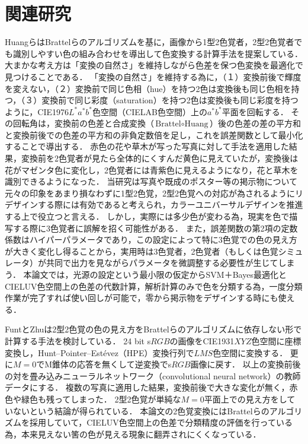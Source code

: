 \documentclass[uplatex,paper=a4,fontsize=4.0truemm,jafontsize=4.0truemm,head_space=30.0truemm,foot_space=30.0truemm,baselineskip=8.0truemm,line_length=40zw,gutter=25.0truemm,oneside,openany,fleqn,hanging_panctuation,open_bracket_pos=nibu_tentsuki,dvipdfmx,jis2004,book,titlepage]{jlreq}
\theoremstyle{mystyle}
\newcommand{\mathdisplaystyle}[1]{\(\displaystyle{#1}\)}
\begin{document}
	\chapter{関連研究}
		HuangらはBrattelらのアルゴリズムを基に，画像から1型2色覚者，2型2色覚者でも識別しやすい色の組み合わせを導出して色変換する計算手法を提案している\cite{Huang2007}．
		大まかな考え方は「変換の自然さ」を維持しながら色差を保つ色変換を最適化で見つけることである．
		「変換の自然さ」を維持する為に，（１）変換前後で輝度を変えない，（２）変換前で同じ色相（hue）を持つ2色は変換後も同じ色相を持つ，（３）変換前で同じ彩度（saturation）を持つ2色は変換後も同じ彩度を持つように，CIE1976\mathdisplaystyle{L^\ast a^\ast b^\ast}色空間（CIELAB色空間）上の\mathdisplaystyle{a^\ast b^\ast}平面を回転する．
		その回転角は，変換前の色差と合成変換（\mathdisplaystyle{\textrm{Brattel}\circ\textrm{Huang}}）後の色差の差の平方和と変換前後での色差の平方和の非負定数倍を足し，これを誤差関数として最小化することで導出する．
		赤色の花や草木が写った写真に対して手法を適用した結果，変換前を2色覚者が見たら全体的にくすんだ黄色に見えていたが，変換後は花がマゼンタ色に変化し，2色覚者には青紫色に見えるようになり，花と草木を識別できるようになった．
		当研究は写真や既成のポスター等の掲示物について元々の印象をあまり損なわずに1型2色覚，2型2色覚への対応が為されるようにリデザインする際には有効であると考えられ，カラーユニバーサルデザインを推進する上で役立つと言える．
		しかし，実際には多少色が変わる為，現実を色で描写する際に3色覚者に誤解を招く可能性がある．
		また，誤差関数の第2項の定数係数はハイパーパラメータであり，この設定によって特に3色覚での色の見え方が大きく変化し得ることから，実用時は3色覚者，2色覚者（もしくは色覚シミュレータ）が共同で出力を見ながらパラメータを微調整する必要性が生じてしまう．
		本論文では，光源の設定という最小限の仮定からSVM＋Bayes最適化とCIELUV色空間上の色差の代数計算，解析計算のみで色を分類する為，一度分類作業が完了すれば使い回しが可能で，零から掲示物をデザインする時にも使える．

		FuntとZhuは2型2色覚の色の見え方をBrattelらのアルゴリズムに依存しない形で計算する手法を検討している\cite{Funt2018}．
		24 bit s\mathdisplaystyle{RGB}の画像をCIE1931\mathdisplaystyle{XYZ}色空間に座標変換し，Hunt--Pointer--Estévez（HPE）変換行列で\mathdisplaystyle{LMS}色空間に変換する．
		更に\mathdisplaystyle{M=0}でM錐体の応答を無くして逆変換でs\mathdisplaystyle{RGB}画像に戻す．
		以上の変換前後の対を畳み込みニューラルネットワーク（convolutional neural network）の教師データにする．
		複数の写真に適用した結果，変換前後で大きな変化が無く，赤色や緑色も残ってしまった．
		2型2色覚が単純な\mathdisplaystyle{M=0}平面上での見え方をしていないという結論が得られている．
		本論文の2色覚変換にはBrattelらのアルゴリズムを採用していて，CIELUV色空間上の色差で分類精度の評価を行っている為，本来見えない筈の色が見える現象に翻弄されにくくなっている．
\end{document}
